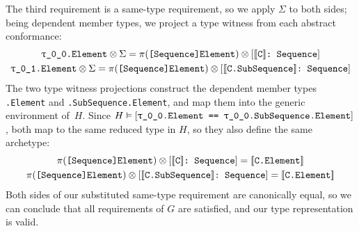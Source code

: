 \documentclass[../generics]{subfiles}
\begin{document}
\begin{example}
The third requirement is a same-type requirement, so we apply $\Sigma$ to both sides; being dependent member types, we project a type witness from each abstract conformance:
\begin{gather*}
\texttt{\texttt{$\uptau$\_0\_0}.Element}\otimes\Sigma=\pi(\texttt{[Sequence]Element})\otimes[\texttt{$[\![\texttt{C}]\!]$:~Sequence}]\\
\texttt{\texttt{$\uptau$\_0\_1}.Element}\otimes\Sigma=\pi(\texttt{[Sequence]Element})\otimes[\texttt{$[\![\texttt{C.SubSequence}]\!]$:~Sequence}]
\end{gather*}
The two type witness projections construct the dependent member types \texttt{.Element} and \texttt{.SubSequence.Element}, and map them into the generic environment of~$H$. Since $H\vDash[\texttt{\texttt{$\uptau$\_0\_0}.Element == \texttt{$\uptau$\_0\_0}.SubSequence.Element}]$, both map to the same reduced type in $H$, so they also define the same archetype:
\begin{gather*}
\AssocType{[Sequence]Element}\otimes\ConfReq{$\archetype{C}$}{Sequence}=\archetype{C.Element}\\
\AssocType{[Sequence]Element}\otimes\ConfReq{$\archetype{C.SubSequence}$}{Sequence}=\archetype{C.Element}
\end{gather*}
Both sides of our substituted same-type requirement are canonically equal, so we can conclude that all requirements of $G$ are satisfied, and our type representation is valid.
\end{example}
\end{document}

